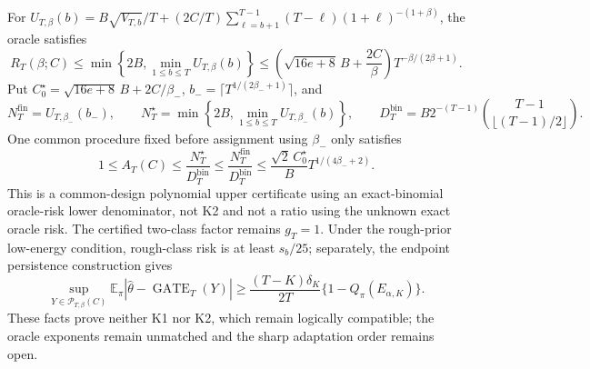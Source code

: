 For \(U_{T,\beta}(b)=B\sqrt{V_{T,b}}/T+(2C/T)\sum_{\ell=b+1}^{T-1}(T-\ell)(1+\ell)^{-(1+\beta)}\), the oracle satisfies
\[
R_T(\beta;C)\le\min\left\{2B,\min_{1\le b\le T}U_{T,\beta}(b)\right\}
\le\left(\sqrt{16e+8}\,B+\frac{2C}{\beta}\right)T^{-\beta/(2\beta+1)}.
\]
Put \(C_0^\star=\sqrt{16e+8}\,B+2C/\beta_-\), \(b_-=\lceil T^{1/(2\beta_-+1)}\rceil\), and
\[
N_T^{\mathrm{fin}}=U_{T,\beta_-}(b_-),\qquad
N_T^\star=\min\left\{2B,\min_{1\le b\le T}U_{T,\beta_-}(b)\right\},\qquad
D_T^{\mathrm{bin}}=B2^{-(T-1)}\binom{T-1}{\lfloor(T-1)/2\rfloor}.
\]
One common procedure fixed before assignment using \(\beta_-\) only satisfies
\[
1\le A_T(C)\le\frac{N_T^\star}{D_T^{\mathrm{bin}}}
\le\frac{N_T^{\mathrm{fin}}}{D_T^{\mathrm{bin}}}
\le\frac{\sqrt2\,C_0^\star}{B}T^{1/(4\beta_-+2)}.
\]
This is a common-design polynomial upper certificate using an exact-binomial oracle-risk lower denominator, not K2 and not a ratio using the unknown exact oracle risk. The certified two-class factor remains \(g_T=1\). Under the rough-prior low-energy condition, rough-class risk is at least \(s_b/25\); separately, the endpoint persistence construction gives
\[
\sup_{Y\in\mathcal P_{T,\beta}(C)}\mathbb E_\pi|\widehat\theta-\operatorname{GATE}_T(Y)|
\ge\frac{(T-K)\delta_K}{2T}\{1-Q_\pi(E_{\alpha,K})\}.
\]
These facts prove neither K1 nor K2, which remain logically compatible; the oracle exponents remain unmatched and the sharp adaptation order remains open.